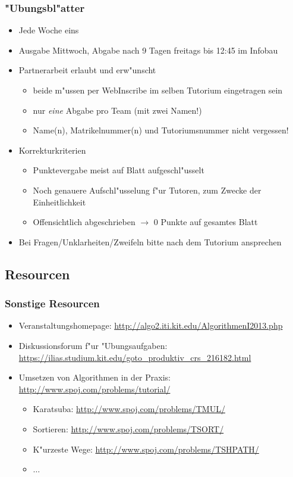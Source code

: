\begin{frame}
  \frametitle{"Ubungsbl"atter}
  \begin{itemize}

  \item Jede Woche eins
  \item Ausgabe Mittwoch, Abgabe nach 9 Tagen freitags bis 12:45 im Infobau
  \item Partnerarbeit erlaubt und erw"unscht
    \begin{itemize}
    \item beide m"ussen per WebInscribe im selben Tutorium eingetragen sein
    \item nur \emph{eine} Abgabe pro Team (mit zwei Namen!)
    \item Name(n), Matrikelnummer(n) und Tutoriumsnummer nicht vergessen!
    \end{itemize}
  \item Korrekturkriterien
    \begin{itemize}
    \item Punktevergabe meist auf Blatt aufgeschl"usselt
    \item Noch genauere Aufschl"usselung f"ur Tutoren, zum Zwecke der Einheitlichkeit
    \item Offensichtlich abgeschrieben $\rightarrow$ 0 Punkte auf gesamtes Blatt
    \end{itemize}
  \item Bei Fragen/Unklarheiten/Zweifeln bitte nach dem Tutorium ansprechen

  \end{itemize}
\end{frame}

\subsection{Resourcen}
\begin{frame}
  \frametitle{Sonstige Resourcen}
  \begin{itemize}
  \item Veranstaltungshomepage: \url{http://algo2.iti.kit.edu/AlgorithmenI2013.php}
  \item Diskussionsforum f"ur "Ubungsaufgaben:
     \small \url{https://ilias.studium.kit.edu/goto_produktiv_crs_216182.html}
  \item Umsetzen von Algorithmen in der Praxis:
          \url{http://www.spoj.com/problems/tutorial/}
    \begin{itemize}
    \item Karatsuba: \url{http://www.spoj.com/problems/TMUL/}
    \item Sortieren: \url{http://www.spoj.com/problems/TSORT/}
    \item K"urzeste Wege: \url{http://www.spoj.com/problems/TSHPATH/}
    \item $\ldots$
    \end{itemize}
  \end{itemize}
\end{frame}

